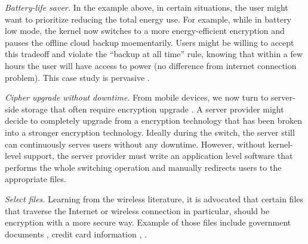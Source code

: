{\em Battery-life saver.}  In the example above, in certain situations,
the user might want to prioritize reducing the total energy use.  For
example, while in battery low mode, the kernel now switches to a more
energy-efficient encryption and pauses the offline cloud backup
moementarily.  Users might be willing to accept this tradeoff and violate
the ``backup at all time'' rule, knowing that within a few hours the user
will have access to power (no difference from internet connection
problem).  This case study is pervasive
\cite{hackernews-???, many-more??}.


{\em Cipher upgrade without downtime.}  From mobile devices, we now turn
to server-side storage that often require encryption upgrade
\cite{some-citations}.  A server provider might decide to completely
upgrade from a encryption technology that has been broken into a stronger
encryption technology.  Ideally during the switch, the server still can
continuously serves users without any downtime.  However, without
kernel-level support, the server provider must write an application level
software that performs the whole switching operation and manually
redirects users to the appropriate files.



{\em Select files.}  Learning from the wireless literature, it is
advocated that certain files that traverse the Internet or wireless
connection in particular, should be encryption with a more secure way.
Example of those files include government documents
\cite{citation-to-this-example}, credit card information \cite{a}, \xxx
\cite{a, b, c}.

